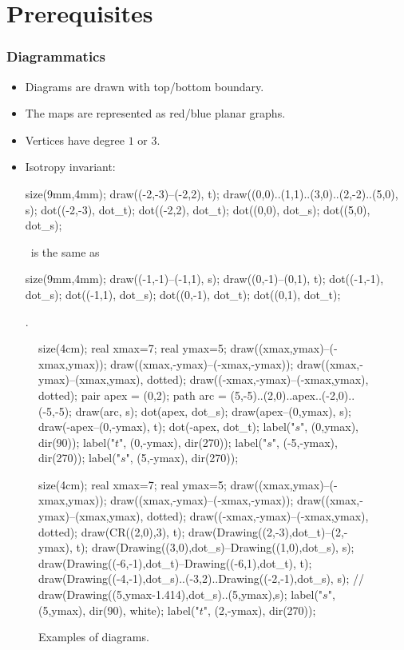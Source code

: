 \documentclass[pdf]{beamer}
\def\ii{\item}
\begin{document}
\section{Prerequisites}
\begin{frame}[fragile]
	\frametitle{Diagrammatics}
	\begin{itemize}
		\ii Diagrams are drawn with top/bottom boundary.
		\ii The maps are represented as red/blue planar graphs.
		\ii Vertices have degree $1$ or $3$.
		\ii Isotropy invariant: 
		\begin{asy}
			size(9mm,4mm);
			draw((-2,-3)--(-2,2), t);
			draw((0,0)..(1,1)..(3,0)..(2,-2)..(5,0), s);
			dot((-2,-3), dot_t);
			dot((-2,2), dot_t);
			dot((0,0), dot_s);
			dot((5,0), dot_s);
		\end{asy}
		\ is the same as
		\begin{asy}
			size(9mm,4mm);
			draw((-1,-1)--(-1,1), s);
			draw((0,-1)--(0,1), t);
			dot((-1,-1), dot_s);
			dot((-1,1), dot_s);
			dot((0,-1), dot_t);
			dot((0,1), dot_t);
		\end{asy}
		.
	\end{itemize}
	\begin{figure}[ht]
		\centering
		\begin{asy}
		size(4cm);
		real xmax=7;
		real ymax=5;
		draw((xmax,ymax)--(-xmax,ymax));
		draw((xmax,-ymax)--(-xmax,-ymax));
		draw((xmax,-ymax)--(xmax,ymax), dotted);
		draw((-xmax,-ymax)--(-xmax,ymax), dotted);
		pair apex = (0,2);
		path arc = (5,-5)..(2,0)..apex..(-2,0)..(-5,-5);
		draw(arc, s);
		dot(apex, dot_s);
		draw(apex--(0,ymax), s);
		draw(-apex--(0,-ymax), t);
		dot(-apex, dot_t);
		label("$s$", (0,ymax), dir(90));
		label("$t$", (0,-ymax), dir(270));
		label("$s$", (-5,-ymax), dir(270));
		label("$s$", (5,-ymax), dir(270));
		\end{asy}
		\begin{asy}
		size(4cm);
		real xmax=7;
		real ymax=5;
		draw((xmax,ymax)--(-xmax,ymax));
		draw((xmax,-ymax)--(-xmax,-ymax));
		draw((xmax,-ymax)--(xmax,ymax), dotted);
		draw((-xmax,-ymax)--(-xmax,ymax), dotted);
		draw(CR((2,0),3), t);
		draw(Drawing((2,-3),dot_t)--(2,-ymax), t);
		draw(Drawing((3,0),dot_s)--Drawing((1,0),dot_s), s);
		draw(Drawing((-6,-1),dot_t)--Drawing((-6,1),dot_t), t);
		draw(Drawing((-4,-1),dot_s)..(-3,2)..Drawing((-2,-1),dot_s), s);
		// draw(Drawing((5,ymax-1.414),dot_s)..(5,ymax),s);
		label("$s$", (5,ymax), dir(90), white);
		label("$t$", (2,-ymax), dir(270));
		\end{asy}
		\caption{Examples of diagrams.}
		\label{fig:example_diagram}
	\end{figure}
\end{frame}
\end{document}
